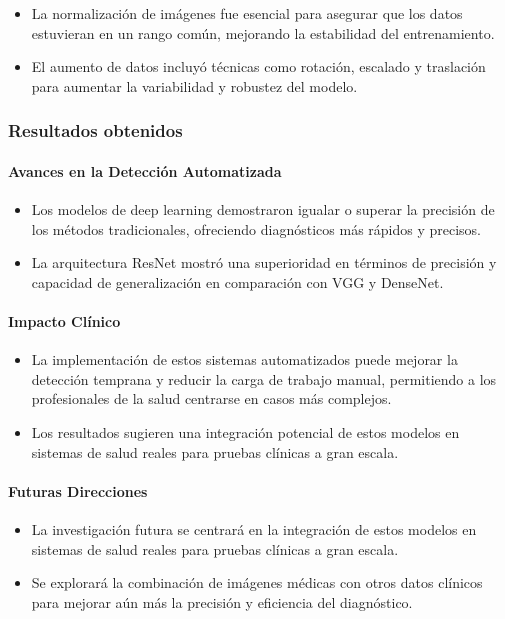 \begin{itemize}
\item La normalización de imágenes fue esencial para asegurar que los datos estuvieran en un rango común, mejorando la estabilidad del entrenamiento.
\item El aumento de datos incluyó técnicas como rotación, escalado y traslación para aumentar la variabilidad y robustez del modelo.
\end{itemize}
\subsubsection{Resultados obtenidos}

\paragraph{Avances en la Detección Automatizada}

\begin{itemize}
\item Los modelos de deep learning demostraron igualar o superar la precisión de los métodos tradicionales, ofreciendo diagnósticos más rápidos y precisos.
\item  La arquitectura ResNet mostró una superioridad en términos de precisión y capacidad de generalización en comparación con VGG y DenseNet.
\end{itemize}
\paragraph{Impacto Clínico}

\begin{itemize}
\item  La implementación de estos sistemas automatizados puede mejorar la detección temprana y reducir la carga de trabajo manual, permitiendo a los profesionales de la salud centrarse en casos más complejos.
\item Los resultados sugieren una integración potencial de estos modelos en sistemas de salud reales para pruebas clínicas a gran escala.
\end{itemize}

\paragraph{Futuras Direcciones}

\begin{itemize}
\item  La investigación futura se centrará en la integración de estos modelos en sistemas de salud reales para pruebas clínicas a gran escala.
\item  Se explorará la combinación de imágenes médicas con otros datos clínicos para mejorar aún más la precisión y eficiencia del diagnóstico.
\end{itemize}

